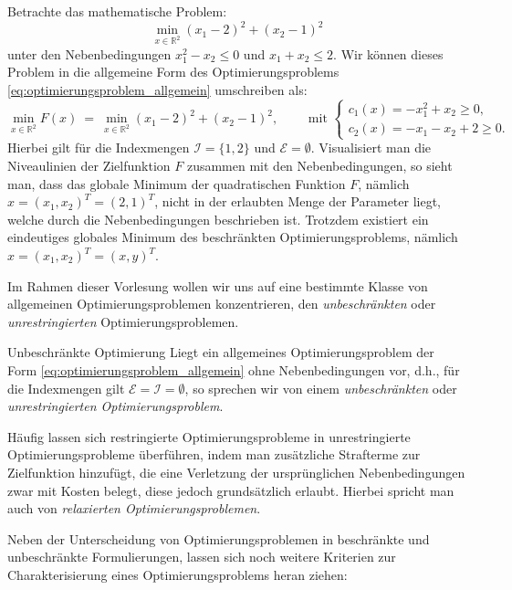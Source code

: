\begin{example}{}{}
Betrachte das mathematische Problem:
\begin{equation*}
\min_{x \in \mathbb{R}^2} (x_1 - 2)^2 + (x_2 - 1)^2
\end{equation*}
unter den Nebenbedingungen $x_1^2 - x_2 \leq 0$ und $x_1 + x_2 \leq 2$. Wir können dieses Problem in die allgemeine Form des Optimierungsproblems \eqref{eq:optimierungsproblem_allgemein} umschreiben als:
\begin{equation*}
\min_{x \in \mathbb{R}^2} F(x) \ = \ \min_{x \in \mathbb{R}^2} (x_1 - 2)^2 + (x_2 - 1)^2, \qquad \text{ mit }
\begin{cases}
c_1(x) = -x_1^2 + x_2 \geq 0,\\
c_2(x) = -x_1 - x_2 + 2 \geq 0.
\end{cases}
\end{equation*}
Hierbei gilt für die Indexmengen $\mathcal{I} = \lbrace 1,2 \rbrace$ und $\mathcal{E} = \emptyset$.
Visualisiert man die Niveaulinien der Zielfunktion $F$ zusammen mit den Nebenbedingungen, so sieht man, dass das globale Minimum der quadratischen Funktion $F$, nämlich $x = (x_1, x_2)^T = (2,1)^T$, nicht in der erlaubten Menge der Parameter liegt, welche durch die Nebenbedingungen beschrieben ist. Trotzdem existiert ein eindeutiges globales Minimum des beschränkten Optimierungsproblems, nämlich $x = (x_1, x_2)^T = (x,y)^T$.
\end{example}
Im Rahmen dieser Vorlesung wollen wir uns auf eine bestimmte Klasse von allgemeinen Optimierungsproblemen konzentrieren, den \textit{unbeschränkten} oder \textit{unrestringierten} Optimierungsproblemen.
\begin{definition}{Unbeschränkte Optimierung}{}
Liegt ein allgemeines Optimierungsproblem der Form \eqref{eq:optimierungsproblem_allgemein} ohne Nebenbedingungen vor, d.h., für die Indexmengen gilt $\mathcal{E} = \mathcal{I} = \emptyset$, so sprechen wir von einem \emph{unbeschränkten} oder \emph{unrestringierten Optimierungsproblem}.
\end{definition}
\begin{remark}{}{}
Häufig lassen sich restringierte Optimierungsprobleme in unrestringierte Optimierungsprobleme überführen, indem man zusätzliche Strafterme zur Zielfunktion hinzufügt, die eine Verletzung der ursprünglichen Nebenbedingungen zwar mit Kosten belegt, diese jedoch grundsätzlich erlaubt. Hierbei spricht man auch von \textit{relaxierten Optimierungsproblemen}.
\end{remark}
Neben der Unterscheidung von Optimierungsproblemen in beschränkte und unbeschränkte Formulierungen, lassen sich noch weitere Kriterien zur Charakterisierung eines Optimierungsproblems heran ziehen:
